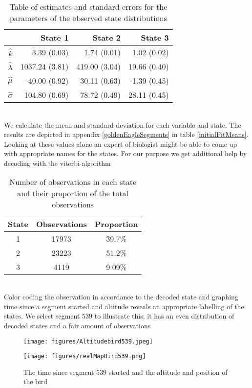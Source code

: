 \begin{table}[ht]
    \centering
    \begin{tabular}{rrrr}
        \hline
        & \textbf{State 1} & \textbf{State 2} & \textbf{State 3} \\
        \hline
        $\hat{k}$ & 3.39 (0.03) & 1.74 (0.01) & 1.02 (0.02) \\
        $\hat{\lambda}$ & 1037.24 (3.81) & 419.00 (3.04) & 19.66 (0.40) \\
        $\hat{\mu}$ & -40.00 (0.92) & 30.11 (0.63) & -1.39 (0.45) \\ 
        $\hat{\sigma}$ & 104.80 (0.69) & 78.72 (0.49) & 28.11 (0.45) \\ 
        \hline
    \end{tabular}
    \caption{Table of estimates and standard errors for the parameters of the observed state distributions}
    \label{estimParam1}
\end{table}\\
We calculate the mean and standard deviation for each variable and state. The results are depicted in appendix \ref{goldenEagleSegments} in table \ref{initialFitMeans}. Looking at these values alone an expert of biologist might be able to come up with appropriate names for the states. For our purpose we get additional help by decoding with the viterbi-algorithm
\begin{table}[ht]
    \centering
    \begin{tabular}{ccc}
        \hline
        \textbf{State} & \textbf{Observations} & \textbf{Proportion} \\
        \hline
        1 & 17973 & 39.7\% \\
        2 & 23223 & 51.2\% \\
        3 & 4119 & 9.09\% \\
        \hline
    \end{tabular}
    \caption{Number of observations in each state and their proportion of the total observations}
    \label{estimWeight1}
\end{table}\\
Color coding the observation in accordance to the decoded state and graphing time since a segment started and altitude reveals an appropriate labelling of the states. We select segment 539 to illustrate this; it has an even distribution of decoded states and a fair amount of observations
\begin{figure}[ht]
  \centering
  \begin{minipage}[b]{0.49\textwidth}
    \texttt{[image: figures/Altitudebird539.jpeg]}
  \end{minipage}
  \hfill
  \begin{minipage}[b]{0.49\textwidth}
    \texttt{[image: figures/realMapBird539.png]}
  \end{minipage}
  \caption{The time since segment 539 started and the altitude and position of the bird \cite{leaflet}}
  \label{bird539}
\end{figure}\\

